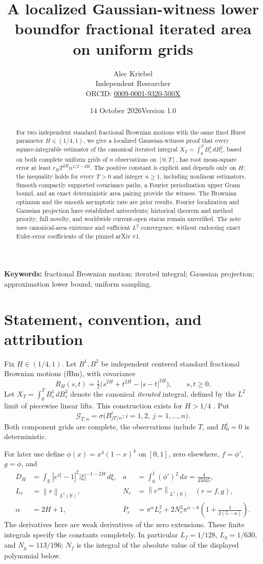 \documentclass[11pt]{article}
\title{A localized Gaussian-witness lower bound\newline for fractional iterated area on uniform grids}
\author{Alec Kriebel\\Independent Researcher\\\small ORCID: \href{https://orcid.org/0009-0001-9320-500X}{0009-0001-9320-500X}}
\date{14 October 2026\quad Version 1.0}
\newcommand{\R}{\mathbb R}
\newcommand{\G}{\mathcal G}
\newcommand{\norm}[1]{\left\lVert#1\right\rVert}
\begin{document}
\maketitle
\begin{abstract}
For two independent standard fractional Brownian motions with the same fixed Hurst parameter $H\in(1/4,1)$, we give a localized Gaussian-witness proof that every square-integrable estimator of the canonical iterated integral $X_T=\int_0^T B^1_s\,dB^2_s$, based on both complete uniform grids of $n$ observations on $[0,T]$, has root mean-square error at least $c_HT^{2H}n^{1/2-2H}$. The positive constant is explicit and depends only on $H$; the inequality holds for every $T>0$ and integer $n\ge1$, including nonlinear estimators. Smooth compactly supported covariance paths, a Fourier periodization upper Gram bound, and an exact deterministic area pairing provide the witness. The Brownian optimum and the smooth asymptotic rate are prior results. Fourier localization and Gaussian projection have established antecedents; historical theorem and method priority, full novelty, and worldwide current-open status remain unverified. The note uses canonical-area existence and sufficient $L^2$ convergence, without endorsing exact Euler-error coefficients of the pinned arXiv v1.
\end{abstract}
\noindent\textbf{Keywords:} fractional Brownian motion; iterated integral; Gaussian projection; approximation lower bound; uniform sampling.

\section{Statement, convention, and attribution}
Fix $H\in(1/4,1)$. Let $B^1,B^2$ be independent centered standard fractional Brownian motions (fBm), with covariance
\[
R_H(s,t)=\tfrac12\bigl(s^{2H}+t^{2H}-|s-t|^{2H}\bigr),\qquad s,t\ge0.
\]
Let $X_T=\int_0^T B^1_s\,dB^2_s$ denote the canonical \emph{iterated} integral, defined by the $L^2$ limit of piecewise linear lifts. This construction exists for $H>1/4$ \cite{ntu}. Put
\[
\G_{T,n}=\sigma\bigl(B^i_{jT/n}: i=1,2,\ j=1,\ldots,n\bigr).
\]
Both component grids are complete, the observations include $T$, and $B^i_0=0$ is deterministic.

For later use define $\phi(x)=x^4(1-x)^4$ on $[0,1]$, zero elsewhere, $f=\phi'$, $g=\phi$, and
\begin{align}
D_H&=\int_{\R}|e^{i\xi}-1|^2|\xi|^{-1-2H}\,d\xi,&
a&=\int_0^1(\phi')^2\,dx=\frac4{45045},\label{eq:constants}\\
L_r&=\norm{r}_{L^1(\R)},&N_r&=\norm{r'''}_{L^1(\R)}\quad(r=f,g),\nonumber\\
\alpha&=2H+1,&
\overline P_r&=\pi^\alpha L_r^2+2N_r^2\pi^{\alpha-6}
\left(1+\frac1{2(5-\alpha)}\right).\label{eq:pbar}
\end{align}
The derivatives here are weak derivatives of the zero extensions. These finite integrals specify the constants completely. In particular $L_f=1/128$, $L_g=1/630$, and $N_g=113/196$; $N_f$ is the integral of the absolute value of the displayed polynomial below.
\end{document}
